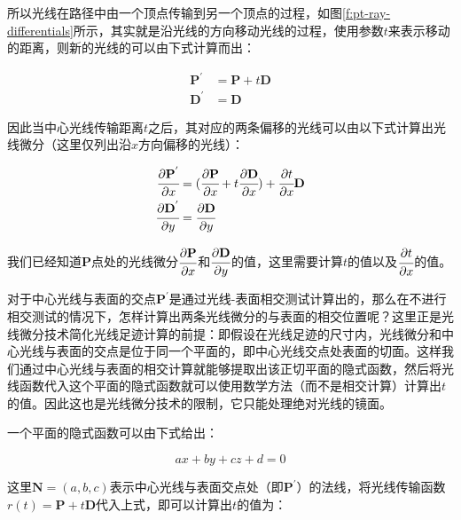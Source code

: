 所以光线在路径中由一个顶点传输到另一个顶点的过程，如图\ref{f:pt-ray-differentials}所示，其实就是沿光线的方向移动光线的过程，使用参数$t$来表示移动的距离，则新的光线的可以由下式计算而出：

\begin{equation}
\begin{aligned}
	\mathbf{P}^{'}&=\mathbf{P}+t\mathbf{D}\\
	\mathbf{D}^{'}&=\mathbf{D}
\end{aligned}
\end{equation}

\noindent 因此当中心光线传输距离$t$之后，其对应的两条偏移的光线可以由以下式计算出光线微分（这里仅列出沿$x$方向偏移的光线）：

\begin{equation}\label{e:pt-ray-transfer}
	\begin{aligned}
		 \cfrac{{\rm \partial}\mathbf{P}^{'}}{{\rm \partial} x}&=( \cfrac{{\rm \partial}\mathbf{P}}{{\rm \partial} x} +t \cfrac{{\rm \partial}\mathbf{D}}{{\rm \partial} x})+ \cfrac{{\rm \partial} t}{{\rm \partial} x}\mathbf{D} \\
		 \cfrac{{\rm \partial}\mathbf{D}^{'}}{{\rm \partial} y}&=  \cfrac{{\rm \partial}\mathbf{D}}{{\rm \partial} y}
	\end{aligned}
\end{equation}

\noindent 我们已经知道$\mathbf{P}$点处的光线微分$ \cfrac{{\rm \partial}\mathbf{P}}{{\rm \partial} x}$和$ \cfrac{{\rm \partial}\mathbf{D}}{{\rm \partial} y}$的值，这里需要计算$t$的值以及$ \cfrac{{\rm \partial} t}{{\rm \partial} x}$的值。

对于中心光线与表面的交点$\mathbf{P}^{'}$是通过光线-表面相交测试计算出的，那么在不进行相交测试的情况下，怎样计算出两条光线微分的与表面的相交位置呢？这里正是光线微分技术简化光线足迹计算的前提：即假设在光线足迹的尺寸内，光线微分和中心光线与表面的交点是位于同一个平面的，即中心光线交点处表面的切面。这样我们通过中心光线与表面的相交计算就能够提取出该正切平面的隐式函数，然后将光线函数代入这个平面的隐式函数就可以使用数学方法（而不是相交计算）计算出$t$的值。因此这也是光线微分技术的限制，它只能处理绝对光线的镜面。

一个平面的隐式函数可以由下式给出：

\begin{equation}
	ax+by+cz+d=0
\end{equation}

\noindent 这里$\mathbf{N}=(a,b,c)$表示中心光线与表面交点处（即$\mathbf{P}^{'}$）的法线，将光线传输函数$r(t)=\mathbf{P}+t\mathbf{D}$代入上式，即可以计算出$t$的值为：

